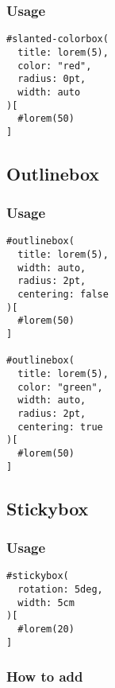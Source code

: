 \subsubsection{Usage}\label{usage-1}

\begin{verbatim}
#slanted-colorbox(
  title: lorem(5),
  color: "red",
  radius: 0pt,
  width: auto
)[
  #lorem(50)
]
\end{verbatim}

\subsection{Outlinebox}\label{outlinebox}


\subsubsection{Usage}\label{usage-2}

\begin{verbatim}
#outlinebox(
  title: lorem(5),
  width: auto,
  radius: 2pt,
  centering: false
)[
  #lorem(50)
]

#outlinebox(
  title: lorem(5),
  color: "green",
  width: auto,
  radius: 2pt,
  centering: true
)[
  #lorem(50)
]
\end{verbatim}

\subsection{Stickybox}\label{stickybox}


\subsubsection{Usage}\label{usage-3}

\begin{verbatim}
#stickybox(
  rotation: 5deg,
  width: 5cm
)[
  #lorem(20)
]
\end{verbatim}

\subsubsection{How to add}\label{how-to-add}

